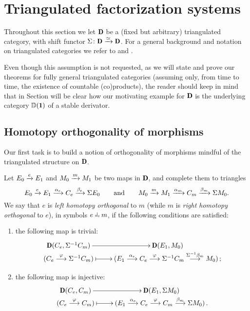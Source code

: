 \section{Triangulated factorization systems}\label{section_homo_FS}
Throughout this section we let $\cD$ be a (fixed but arbitrary) triangulated category, with shift functor $\Sigma\colon \cD \xto{\simeq} \cD$. For a general background and notation on triangulated categories we refer to \cite{Neeman} and \cite[Appendix \textbf{A}]{hps:axiomatic}. 

Even though this assumption is not requested, as we will state and prove our theorems for fully general triangulated categories (assuming only, from time to time, the existence of countable (co)products), the reader should keep in mind that in Section  will be clear how our motivating example for $\cD$ is the underlying category $\D(\uno)$ of a stable derivator.
\subsection{Homotopy orthogonality of morphisms}\label{horth_subs}
Our first task is to build a notion of orthogonality of morphisms mindful of the triangulated structure on $\cD$.
\begin{definition}\label{wobbly}
Let $E_0 \xrightarrow{e} E_1$ and $M_0 \xrightarrow{m} M_1$ be two maps in $\cD$, and complete them to triangles
\begin{equation}\label{triangles}
E_0 \xrightarrow{e}  E_1 \xrightarrow{\alpha_e} C_e \xrightarrow{\beta_e} \Sigma E_0
\qquad \text{and}\qquad 
M_0 \xrightarrow{m}  M_1 \xrightarrow{\alpha_m} C_m \xrightarrow{\beta_m} \Sigma M_0.
\end{equation}
We say that $e$ is \emph{left homotopy orthogonal} to $m$ (while $m$ is \emph{right homotopy orthogonal} to $e$), in symbols $e \horth m$, if the following conditions are satisfied:
\begin{enumerate}[label=\textsc{ho}\arabic*.]
\item \label{fst}the following map is trivial:
$$\xymatrix@R=0pt{\cD(C_e,\Sigma^{-1}C_m)\ar[r]& \cD(E_1,M_0)\\
(C_e\overset{\varphi}{\longrightarrow}\Sigma^{-1}C_m)\ar@{|->}[r]&(E_1\overset{\alpha_e}{\longrightarrow}C_e\overset{\varphi}{\longrightarrow}\Sigma^{-1}C_m\overset{\Sigma^{-1}\beta_m}{\longrightarrow}M_0)\,;}$$
\item \label{snd}the following map is injective:
$$\xymatrix@R=0pt{\cD(C_e,C_m)\ar[r]& \cD(E_1,\Sigma M_0)\\
(C_e\overset{\varphi}{\longrightarrow}C_m)\ar@{|->}[r]&(E_1\overset{\alpha_e}{\longrightarrow}C_e\overset{\varphi}{\longrightarrow}C_m\overset{\beta_m}{\longrightarrow}\Sigma M_0)\,.}$$
\end{enumerate}
\end{definition}


